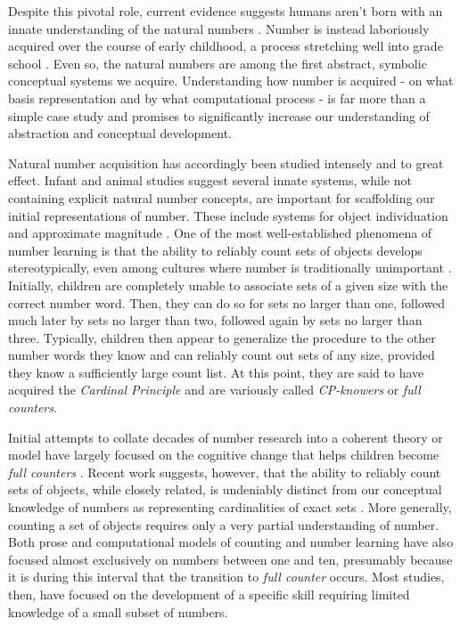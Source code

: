 \documentclass[10pt,letterpaper]{article}
\begin{document}
Despite this pivotal role, current evidence suggests humans aren't
born with an innate understanding of the natural numbers
\citep{Car2009}. Number is instead laboriously acquired over the
course of early childhood, a process stretching well into grade school
\citep{Nat2010}. Even so, the natural numbers are among the first
abstract, symbolic conceptual systems we acquire. Understanding how
number is acquired - on what basis representation and by what
computational process - is far more than a simple case study and
promises to significantly increase our understanding of abstraction
and conceptual development.

Natural number acquisition has accordingly been studied intensely and
to great effect. Infant and animal studies suggest several innate
systems, while not containing explicit natural number concepts, are
important for scaffolding our initial representations of number. These
include systems for object individuation and approximate magnitude
\citep{feigenson2004core,dehaene2011number}. One of the most
well-established phenomena of number learning is that the ability to
reliably count sets of objects develops stereotypically, even among
cultures where number is traditionally unimportant
\citep{Wyn1992,JarPianSpelEtAl2014}. Initially, children are
completely unable to associate sets of a given size with the correct
number word. Then, they can do so for sets no larger than one,
followed much later by sets no larger than two, followed again by
sets no larger than three. Typically, children then appear to
generalize the procedure to the other number words they know and can
reliably count out sets of any size, provided they know a sufficiently
large count list. At this point, they are said to have acquired the
\emph{Cardinal Principle} and are variously called \emph{CP-knowers}
or \emph{full counters}.

Initial attempts to collate decades of number research into a coherent
theory or model have largely focused on the cognitive change that
helps children become \emph{full counters}
\citep{Car2009,PianGoodTen2012}. Recent work suggests, however, that
the ability to reliably count sets of objects, while closely related,
is undeniably distinct from our conceptual knowledge of numbers as
representing cardinalities of exact sets
\citep{DavEngBar2012,izard2014toward,JarPianSpelEtAl2014}. More
generally, counting a set of objects requires only a very partial
understanding of number. Both prose and computational models of
counting and number learning have also focused almost exclusively on
numbers between one and ten, presumably because it is during this
interval that the transition to \emph{full counter} occurs. Most
studies, then, have focused on the development of a specific skill
requiring limited knowledge of a small subset of numbers.
\end{document}
